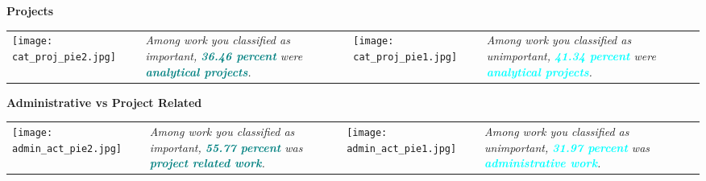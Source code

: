 \documentclass[a4paper]{article}
\begin{document}
\begin{center}
    \Large{\textbf{Projects}}
    \end{center}
    \begin{table}[h!]
     \begin{center}
     \begin{tabular}{m{4cm} m{3.5cm} m{4cm} m{3.5cm}}
          \begin {minipage} {4cm}
              \texttt{[image: cat\_proj\_pie2.jpg]}
         \end{minipage}
    &
              \begin {minipage} {3.5cm}
      \large{\textit{Among work you classified as important, \textbf{\textcolor{teal}{36.46 percent}} were \textbf{\textcolor{teal}{analytical projects}}.}}
             \end{minipage}
      &
            \begin {minipage} {4cm}
    \texttt{[image: cat\_proj\_pie1.jpg]}
     \end{minipage}
      &
     \begin {minipage} {3.5cm}
      \large{\textit{Among work you classified as unimportant, \textbf{\textcolor{cyan}{41.34 percent}} were \textbf{\textcolor{cyan}{analytical projects}}.}}
               \end{minipage}
      \end{tabular}
      \end{center}
      \end{table}

\begin{center}
    \Large{\textbf{Administrative vs Project Related}}
    \end{center}
    \begin{table}[h!]
     \begin{center}
     \begin{tabular}{m{4cm} m{3.5cm} m{4cm} m{3.5cm}}
     \begin {minipage} {5cm}
         \texttt{[image: admin\_act\_pie2.jpg]}
              \end{minipage}
              &
      \begin {minipage} {3.5cm}
    \large{\textit{Among work you classified as important, \textbf{\textcolor{teal}{55.77 percent}} was \textbf{\textcolor{teal}{project related work}}.}}
     \end{minipage}
      & 
      \begin{minipage}{4cm}
          \texttt{[image: admin\_act\_pie1.jpg]}
      \end{minipage}
      &
      \begin{minipage}{3.5cm}
      \large{\textit{Among work you classified as unimportant, \textbf{\textcolor{cyan}{31.97 percent}} was \textbf{\textcolor{cyan}{administrative work}}.}}
      \end{minipage}
      \end{tabular}
      \end{center}
      \end{table}
\end{document}
